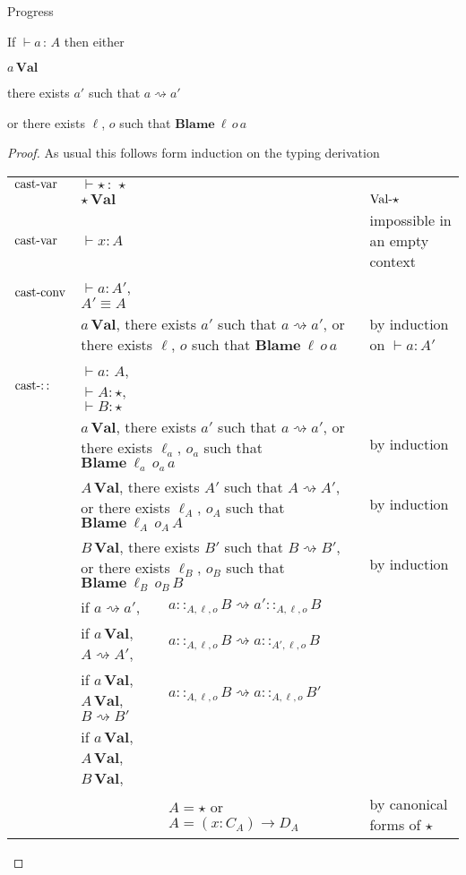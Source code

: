 \begin{thm}
Progress

If $\vdash a\,:\,A$ then either 

$a\,\textbf{Val}$

there exists $a'$ such that $a\rightsquigarrow a'$

or there exists $\ell$, $o$ such that $\textbf{Blame}\:\ensuremath{\ell}\,o\,a$
\end{thm}

\begin{proof}
As usual this follows form induction on the typing derivation

\begin{tabular}{lllll}
$\operatorname{cast-var}$ & $\vdash\star\,:\,\star$ &  &  & \tabularnewline
 & $\star\,\textbf{Val}$ &  &  & $\operatorname{Val-\star}$\tabularnewline
$\operatorname{cast-var}$ & $\vdash x:A$ &  &  & impossible in an empty context\tabularnewline
$\operatorname{cast-conv}$ & $\vdash a:A'$, $A'\equiv A$ &  &  & \tabularnewline
 & \multicolumn{3}{l}{$a\,\textbf{Val}$, there exists $a'$ such that $a\rightsquigarrow a'$,
or there exists $\ell$, $o$ such that $\textbf{Blame}\:\ensuremath{\ell}\,o\,a$} & by induction on $\vdash a:A'$\tabularnewline
$\operatorname{cast-::}$ & $\vdash a:\,A$, $\vdash A:\star$, $\vdash B:\star$ &  &  & \tabularnewline
 & \multicolumn{3}{l}{$a\,\textbf{Val}$, there exists $a'$ such that $a\rightsquigarrow a'$,
or there exists $\ell_{a}$, $o_{a}$ such that $\textbf{Blame}\:\ensuremath{\ell}_{a}\,o_{a}\,a$} & by induction\tabularnewline
 & \multicolumn{3}{l}{$A\,\textbf{Val}$, there exists $A'$ such that $A\rightsquigarrow A'$,
or there exists $\ell_{A}$, $o_{A}$ such that $\textbf{Blame}\:\ensuremath{\ell}_{A}\,o_{A}\,A$} & by induction\tabularnewline
 & \multicolumn{3}{l}{$B\,\textbf{Val}$, there exists $B'$ such that $B\rightsquigarrow B'$,
or there exists $\ell_{B}$, $o_{B}$ such that $\textbf{Blame}\:\ensuremath{\ell}_{B}\,o_{B}\,B$} & by induction\tabularnewline
 & if $a\rightsquigarrow a'$,  & $a::_{A,\ensuremath{\ell},o}B\rightsquigarrow a'::_{A,\ensuremath{\ell},o}B$ &  & \tabularnewline
 & if $a\,\textbf{Val}$, $A\rightsquigarrow A'$, & $a::_{A,\ensuremath{\ell},o}B\rightsquigarrow a::_{A',\ensuremath{\ell},o}B$ &  & \tabularnewline
 & if $a\,\textbf{Val}$, $A\,\textbf{Val}$, $B\rightsquigarrow B'$ & $a::_{A,\ensuremath{\ell},o}B\rightsquigarrow a::_{A,\ensuremath{\ell},o}B'$ &  & \tabularnewline
 & if $a\,\textbf{Val}$, $A\,\textbf{Val}$, $B\,\textbf{Val}$, &  &  & \tabularnewline
 &  & $A=\star$ or $A=\left(x:C_{A}\right)\rightarrow D_{A}$ &  & by canonical forms of $\star$\tabularnewline

\end{tabular}
\end{proof}
